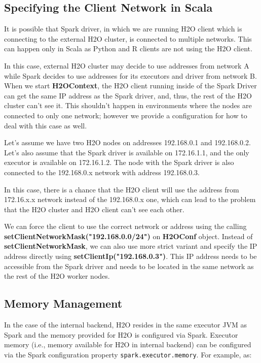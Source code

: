 \subsection{Specifying the Client Network in Scala}
\label{subsection:specify_ip}

It is possible that Spark driver, in which we are running H2O client which is connecting to the external H2O cluster, is
connected to multiple networks. This can happen only in Scala as Python and R clients are not using the H2O client.

In this case, external H2O cluster may decide to use addresses from network A while Spark decides to use
addresses for its executors and driver from network B. When we start \textbf{H2OContext}, the H2O
client running inside of the Spark Driver can get the same IP address as the Spark driver, and, thus, the rest
of the H2O cluster can't see it. This shouldn't happen in environments where the nodes are connected to only one
network; however we provide a configuration for how to deal with this case as well.

Let's assume we have two H2O nodes on addresses 192.168.0.1 and 192.168.0.2. Let's also assume that the Spark driver
is available on 172.16.1.1, and the only executor is available on 172.16.1.2. The node with the Spark driver
is also connected to the 192.168.0.x network with address 192.168.0.3.

In this case, there is a chance that the H2O client will use the address from 172.16.x.x network instead
of the 192.168.0.x one, which can lead to the problem that the H2O cluster and H2O client can't see each other.

We can force the client to use the correct network or address using the calling \textbf{setClientNetworkMask("192.168.0.0/24")}
on \textbf{H2OConf} object. Instead of \textbf{setClientNetworkMask}, we can also use more strict variant and specify
the IP address directly using \textbf{setClientIp("192.168.0.3")}. This IP address needs to be accessible from the
Spark driver and needs to be located in the same network as the rest of the H2O worker nodes.

\subsection{Memory Management}

In the case of the internal backend, H2O resides in the same executor JVM as Spark and the memory provided for H2O is configured
via Spark.
Executor memory (i.e., memory available for H2O in internal backend) can be configured via the Spark configuration
property \texttt{spark.executor.memory}. For example, as:


